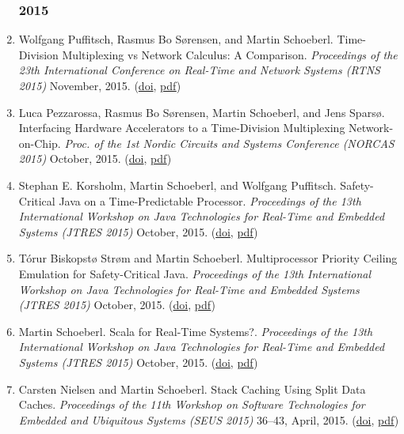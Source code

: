 \begin{enumerate}
\subsubsection*{2015}

\item Wolfgang Puffitsch, Rasmus Bo S{\o}rensen, and Martin Schoeberl.
 Time-Division Multiplexing vs Network Calculus: A Comparison.
 \emph{Proceedings of the 23th International Conference on Real-Time and Network Systems (RTNS 2015)} November, 2015.
(\href{http://dx.doi.org/10.1145/2834848.2834868}{doi}, \href{http://www.jopdesign.com/doc/tdmvsnc.pdf}{pdf})

\item Luca Pezzarossa, Rasmus Bo S{\o}rensen, Martin Schoeberl, and Jens Spars{\o}.
 Interfacing Hardware Accelerators to a Time-Division Multiplexing Network-on-Chip.
 \emph{Proc. of the 1st Nordic Circuits and Systems Conference (NORCAS 2015)} October, 2015.
(\href{http://dx.doi.org/10.1109/NORCHIP.2015.7364392}{doi}, \href{http://www.jopdesign.com/doc/tdm-fpu.pdf}{pdf})

\item Stephan E. Korsholm, Martin Schoeberl, and Wolfgang Puffitsch.
 Safety-Critical Java on a Time-Predictable Processor.
 \emph{Proceedings of the 13th International Workshop on Java Technologies for Real-Time and Embedded Systems (JTRES 2015)} October, 2015.
(\href{http://dx.doi.org/10.1145/2822304.2822309}{doi}, \href{http://www.jopdesign.com/doc/scjpat.pdf}{pdf})

\item T{\'o}rur Biskopst{\o} Str{\o}m and Martin Schoeberl.
 Multiprocessor Priority Ceiling Emulation for Safety-Critical Java.
 \emph{Proceedings of the 13th International Workshop on Java Technologies for Real-Time and Embedded Systems (JTRES 2015)} October, 2015.
(\href{http://dx.doi.org/10.1145/2822304.2822308}{doi}, \href{http://www.jopdesign.com/doc/joppce.pdf}{pdf})

\item Martin Schoeberl.
 Scala for Real-Time Systems?.
 \emph{Proceedings of the 13th International Workshop on Java Technologies for Real-Time and Embedded Systems (JTRES 2015)} October, 2015.
(\href{http://dx.doi.org/10.1145/2822304.2822313}{doi}, \href{http://www.jopdesign.com/doc/rtscala.pdf}{pdf})

\item Carsten Nielsen and Martin Schoeberl.
 Stack Caching Using Split Data Caches.
 \emph{Proceedings of the 11th Workshop on Software Technologies for Embedded and Ubiquitous Systems (SEUS 2015)} 36--43, April, 2015.
(\href{http://dx.doi.org/10.1109/ISORC.W20.21051.59.59}{doi}, \href{http://www.jopdesign.com/doc/scascache.pdf}{pdf})


\end{enumerate}
